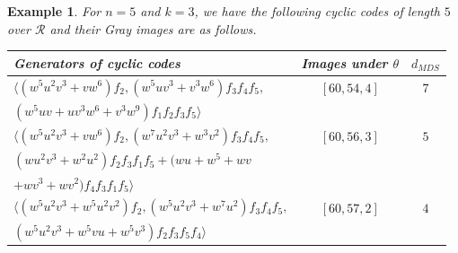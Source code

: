 \documentclass{amsart}
\newtheorem{example}[theorem]{Example}
\theoremstyle{definition}
\theoremstyle{remark}
\numberwithin{equation}{section}
\begin{document}
\begin{example}
    For $n=5$ and $k=3$, we have the following cyclic codes of length $5$ over $\mathcal{R}$ and their Gray images are as follows.
        
		{\renewcommand{\arraystretch}{1.2}\begin{longtable}{| l | c | c | }

		\hline
			    	Generators of cyclic codes & Images under $\theta$
                      & $d_{MDS}$ \\
					\hline	
					$\langle (w^5u^2v^3 + vw^6)f_2,(w^5uv^3 + v^3w^6)f_3f_4f_5,$
                      &  $[60,54,4]$& $7$  \\
                        $ (w^5uv + uv^3w^6 + v^3w^9  )f_1f_2f_3f_5\rangle $    & &  \\
					$\langle (w^5u^2v^3 + vw^6)f_2,(w^7u^2v^3 + w^3v^2)f_3f_4f_5,$ &
                        $[60,56,3]$
                      & $5$ \\
                       $(wu^2v^3 + w^2u^2)f_2f_3f_1f_5 + (wu + w^5 + wv $ & &  \\
                   $+ wv^3 + wv^2)f_4f_3f_1f_5\rangle $ & &  \\
					$\langle (w^5u^2v^3 + w^5u^2v^2)f_2,(w^5u^2v^3 + w^7u^2)f_3f_4f_5,$ &  $[60,57,2]$ & $4$  \\
                       $(w^5u^2v^3 + w^5vu + w^5v^3)f_2f_3f_5f_4\rangle$ & &  \\
                      \hline
		\end{longtable}}
\end{example}
\end{document}
